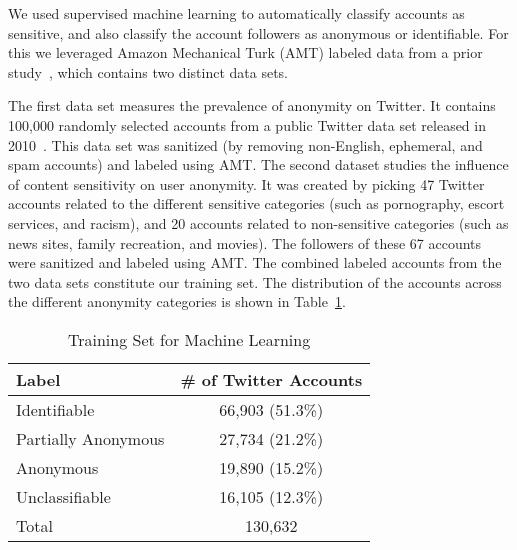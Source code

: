 \documentclass[conference]{IEEEtran}
\begin{document}
We used supervised machine learning to automatically classify accounts as sensitive, and also classify the account followers as anonymous or identifiable. For this we leveraged Amazon Mechanical Turk (AMT) labeled data from a prior study~\cite{PeddintiCOSN2014}, which contains two distinct data sets. 

The first data set measures the prevalence of anonymity on Twitter. It contains 100,000 randomly selected accounts from a  public Twitter data set released in 2010~\cite{twittersocialmedia}. This data set was sanitized (by removing non-English, ephemeral, and spam accounts)
and labeled using AMT. The second dataset studies the influence of content sensitivity on user anonymity. It was created by picking 47 Twitter accounts related to the different sensitive categories (such as pornography, escort services, and racism), and 20 accounts related to non-sensitive categories (such as news sites, family recreation, and movies). The followers of these 67 accounts were sanitized 
and labeled using AMT. The combined labeled accounts from the two data sets constitute our training set. The distribution of the accounts across the different anonymity categories is shown in Table~\ref{tab:trainingset}.

\begin{table}[thbp]
\small
\begin{center}
\caption{Training Set for Machine Learning}
\label{tab:trainingset}
\begin{tabular}{| l | c |}
\hline
\textbf{Label} & \textbf{\# of Twitter Accounts}\\
\hline
Identifiable & 66,903 (51.3\%)\\
\hline
Partially Anonymous & 27,734 (21.2\%)\\
\hline
Anonymous & 19,890 (15.2\%)\\
\hline
Unclassifiable & 16,105 (12.3\%) \\
\hline
\hline
Total & 130,632 \\
\hline  
\end{tabular}
\end{center}
\vspace{-1.0em}
\end{table}
\end{document}

